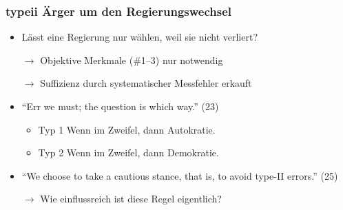 \documentclass{beamer}
\begin{document}
\begin{frame}
  \frametitle{{\sc typeii} Ärger um den Regierungswechsel}
  \begin{itemize}
    \item Lässt eine Regierung nur wählen, weil sie nicht verliert?
    \item[$\rightarrow$] Objektive Merkmale (\#1--3) nur notwendig
    \item[$\rightarrow$] Suffizienz durch systematischer Messfehler erkauft
    \item ``Err we must; the question is which way.'' (23)
    \begin{itemize}
      \item Typ 1 Wenn im Zweifel, dann Autokratie.
      \item Typ 2 Wenn im Zweifel, dann Demokratie.
    \end{itemize}
    \item ``We choose to take a cautious stance, that is, to avoid type-II errors.'' (25)
    \item [$\rightarrow$] Wie einflussreich ist diese Regel eigentlich?
  \end{itemize}
\end{frame}
\end{document}
